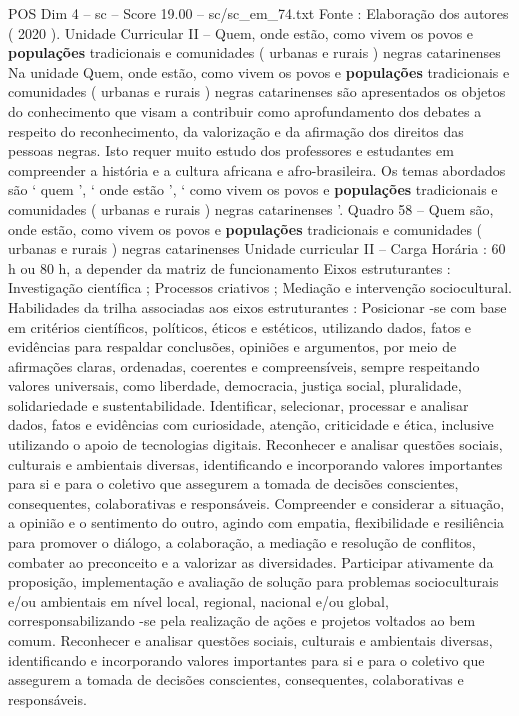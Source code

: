 \begin{textsample}{POS Dim 4 – sc – Score 19.00 – sc/sc\_em\_74.txt}
Fonte : Elaboração dos autores ( 2020 ).
Unidade Curricular II – Quem, onde estão, como vivem os povos e \textbf{populações} tradicionais e comunidades ( urbanas e rurais ) negras catarinenses Na unidade Quem, onde estão, como vivem os povos e \textbf{populações} tradicionais e comunidades ( urbanas e rurais ) negras catarinenses são apresentados os objetos do conhecimento que visam a contribuir como aprofundamento dos debates a respeito do reconhecimento, da valorização e da afirmação dos direitos das pessoas negras.
Isto requer muito estudo dos professores e estudantes em compreender a história e a cultura africana e afro-brasileira.
Os temas abordados são ‘ quem ’, ‘ onde estão ’, ‘ como vivem os povos e \textbf{populações} tradicionais e comunidades ( urbanas e rurais ) negras catarinenses ’.
Quadro 58 – Quem são, onde estão, como vivem os povos e \textbf{populações} tradicionais e comunidades ( urbanas e rurais ) negras catarinenses Unidade curricular II – Carga Horária : 60 h ou 80 h, a depender da matriz de funcionamento Eixos estruturantes : Investigação científica ; Processos criativos ; Mediação e intervenção sociocultural.
Habilidades da trilha associadas aos eixos estruturantes : Posicionar -se com base em critérios científicos, políticos, éticos e estéticos, utilizando dados, fatos e evidências para respaldar conclusões, opiniões e argumentos, por meio de afirmações claras, ordenadas, coerentes e compreensíveis, sempre respeitando valores universais, como liberdade, democracia, justiça social, pluralidade, solidariedade e sustentabilidade.
Identificar, selecionar, processar e analisar dados, fatos e evidências com curiosidade, atenção, criticidade e ética, inclusive utilizando o apoio de tecnologias digitais.
Reconhecer e analisar questões sociais, culturais e ambientais diversas, identificando e incorporando valores importantes para si e para o coletivo que assegurem a tomada de decisões conscientes, consequentes, colaborativas e responsáveis.
Compreender e considerar a situação, a opinião e o sentimento do outro, agindo com empatia, flexibilidade e resiliência para promover o diálogo, a colaboração, a mediação e resolução de conflitos, combater ao preconceito e a valorizar as diversidades.
Participar ativamente da proposição, implementação e avaliação de solução para problemas socioculturais e/ou ambientais em nível local, regional, nacional e/ou global, corresponsabilizando -se pela realização de ações e projetos voltados ao bem comum.
Reconhecer e analisar questões sociais, culturais e ambientais diversas, identificando e incorporando valores importantes para si e para o coletivo que assegurem a tomada de decisões conscientes, consequentes, colaborativas e responsáveis.

\end{textsample}
